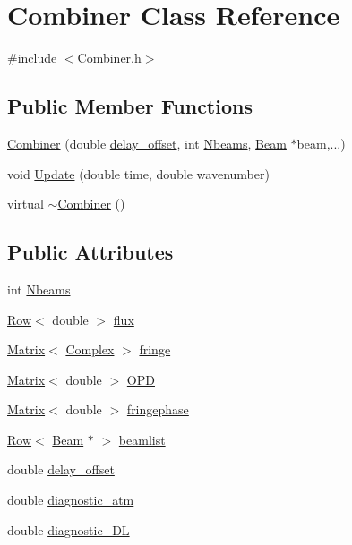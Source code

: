 \hypertarget{classCombiner}{
\section{Combiner Class Reference}
\label{classCombiner}
}


{\ttfamily \#include $<$Combiner.h$>$}

\subsection*{Public Member Functions}
\begin{DoxyCompactItemize}
\item 
\hyperlink{classCombiner_acb929ab3e336121021ae790108280f8d}{Combiner} (double \hyperlink{classCombiner_acd026e8b726df8c49812ee99a4a2c94b}{delay\_\-offset}, int \hyperlink{classCombiner_a4e7f1498813ae735a155eee97da2a7e5}{Nbeams}, \hyperlink{classBeam}{Beam} $\ast$beam,...)
\item 
void \hyperlink{classCombiner_ac2f8f2ab1dba11aa15c29776d78229a5}{Update} (double time, double wavenumber)
\item 
virtual \hyperlink{classCombiner_a9df9f0ea0076115ceb11eea79b3d0b55}{$\sim$Combiner} ()
\end{DoxyCompactItemize}
\subsection*{Public Attributes}
\begin{DoxyCompactItemize}
\item 
int \hyperlink{classCombiner_a4e7f1498813ae735a155eee97da2a7e5}{Nbeams}
\item 
\hyperlink{classRow}{Row}$<$ double $>$ \hyperlink{classCombiner_a408d595f014d41fd6b31eda9916067bb}{flux}
\item 
\hyperlink{classMatrix}{Matrix}$<$ \hyperlink{Matrix_8h_a37333e1628babc1863d6963489e5e9ea}{Complex} $>$ \hyperlink{classCombiner_ad60574dad3bc9de3c4c317ebdcdedaf1}{fringe}
\item 
\hyperlink{classMatrix}{Matrix}$<$ double $>$ \hyperlink{classCombiner_ae0a2d5921b449ebe0c96f5ca9b817ce4}{OPD}
\item 
\hyperlink{classMatrix}{Matrix}$<$ double $>$ \hyperlink{classCombiner_ab5bcedbadbe41f1887953228fd1df77d}{fringephase}
\item 
\hyperlink{classRow}{Row}$<$ \hyperlink{classBeam}{Beam} $\ast$ $>$ \hyperlink{classCombiner_ae36808805deccd22a33012b67783d7f6}{beamlist}
\item 
double \hyperlink{classCombiner_acd026e8b726df8c49812ee99a4a2c94b}{delay\_\-offset}
\item 
double \hyperlink{classCombiner_a7e44ac6556a4b96f1f3f52986970df33}{diagnostic\_\-atm}
\item 
double \hyperlink{classCombiner_a7e51816d5a254fab875a6d25198fc322}{diagnostic\_\-DL}
\end{DoxyCompactItemize}


